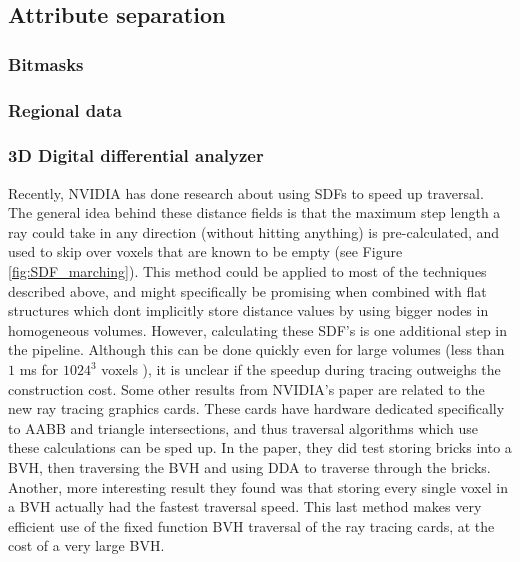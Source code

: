 \subsection{Attribute separation} \label{introduction:attribute_separation}
\subsubsection{Bitmasks} \label{introduction:attribute_separation:bitmasks}
\subsubsection{Regional data} \label{introduction:attribute_separation:regional_data}
\subsubsection{3D Digital differential analyzer} \label{introduction:attribute_separation:dda}
Recently, NVIDIA has done research about using SDFs to speed up traversal\cite{soderlund2022ray}. The general idea behind these distance fields is that the maximum step length a ray could take in any direction (without hitting anything) is pre-calculated, and used to skip over voxels that are known to be empty (see Figure \ref{fig:SDF_marching}). This method could be applied to most of the techniques described above, and might specifically be promising when combined with flat structures which dont implicitly store distance values by using bigger nodes in homogeneous volumes. However, calculating these SDF's is one additional step in the pipeline. Although this can be done quickly even for large volumes (less than $1$ ms for $1024^3$ voxels \cite{cao2010parallel}), it is unclear if the speedup during tracing outweighs the construction cost. Some other results from NVIDIA's paper are related to the new ray tracing graphics cards. These cards have hardware dedicated specifically to AABB and triangle intersections, and thus traversal algorithms which use these calculations can be sped up. In the paper, they did test storing bricks into a BVH, then traversing the BVH and using DDA to traverse through the bricks. Another, more interesting result they found was that storing every single voxel in a BVH actually had the fastest traversal speed. This last method makes very efficient use of the fixed function BVH traversal of the ray tracing cards, at the cost of a very large BVH.

